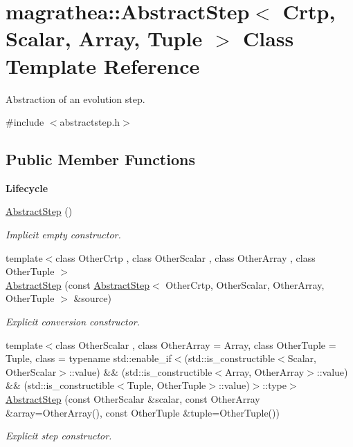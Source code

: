 \hypertarget{classmagrathea_1_1AbstractStep}{\section{magrathea\-:\-:Abstract\-Step$<$ Crtp, Scalar, Array, Tuple $>$ Class Template Reference}
\label{classmagrathea_1_1AbstractStep}
}


Abstraction of an evolution step.  




{\ttfamily \#include $<$abstractstep.\-h$>$}

\subsection*{Public Member Functions}
\begin{Indent}{\bf Lifecycle}\par
\begin{DoxyCompactItemize}
\item 
\hyperlink{classmagrathea_1_1AbstractStep_afbbeb00b0e104c7e6737d6af782232b1}{Abstract\-Step} ()
\begin{DoxyCompactList}\small\item\em Implicit empty constructor. \end{DoxyCompactList}\item 
{\footnotesize template$<$class Other\-Crtp , class Other\-Scalar , class Other\-Array , class Other\-Tuple $>$ }\\\hyperlink{classmagrathea_1_1AbstractStep_a5ac5108646863a17a498c9b405399f38}{Abstract\-Step} (const \hyperlink{classmagrathea_1_1AbstractStep}{Abstract\-Step}$<$ Other\-Crtp, Other\-Scalar, Other\-Array, Other\-Tuple $>$ \&source)
\begin{DoxyCompactList}\small\item\em Explicit conversion constructor. \end{DoxyCompactList}\item 
{\footnotesize template$<$class Other\-Scalar , class Other\-Array  = Array, class Other\-Tuple  = Tuple, class  = typename std\-::enable\-\_\-if$<$(std\-::is\-\_\-constructible$<$\-Scalar, Other\-Scalar$>$\-::value) \&\& (std\-::is\-\_\-constructible$<$\-Array, Other\-Array$>$\-::value) \&\& (std\-::is\-\_\-constructible$<$\-Tuple, Other\-Tuple$>$\-::value)$>$\-::type$>$ }\\\hyperlink{classmagrathea_1_1AbstractStep_a26c0255b3421d15ff9e24e6415469147}{Abstract\-Step} (const Other\-Scalar \&scalar, const Other\-Array \&array=Other\-Array(), const Other\-Tuple \&tuple=Other\-Tuple())
\begin{DoxyCompactList}\small\item\em Explicit step constructor. \end{DoxyCompactList}\end{DoxyCompactItemize}
\end{Indent}
